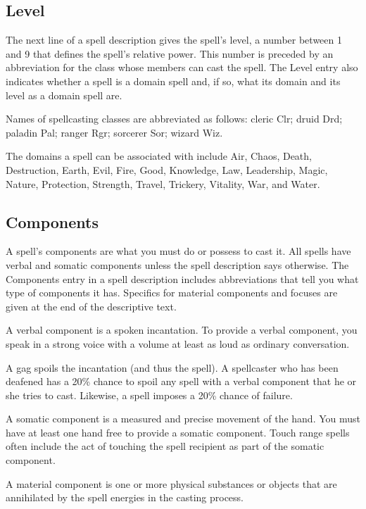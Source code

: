 \subsection{Level}
The next line of a spell description gives the spell's level, a number between 1 and 9 that defines the spell's relative power. This number is preceded by an abbreviation for the class whose members can cast the spell. The Level entry also indicates whether a spell is a domain spell and, if so, what its domain and its level as a domain spell are.

Names of spellcasting classes are abbreviated as follows: cleric Clr; druid Drd; paladin Pal; ranger Rgr; sorcerer Sor; wizard Wiz.

The domains a spell can be associated with include Air, Chaos, Death, Destruction, Earth, Evil, Fire, Good, Knowledge, Law, Leadership, Magic, Nature, Protection, Strength, Travel, Trickery, Vitality, War, and Water.

\subsection{Components}
A spell's components are what you must do or possess to cast it. All spells have verbal and somatic components unless the spell description says otherwise. The Components entry in a spell description includes abbreviations that tell you what type of components it has. Specifics for material components and focuses are given at the end of the descriptive text.

 A verbal component is a spoken incantation. To provide a verbal component, you speak in a strong voice with a volume at least as loud as ordinary conversation.

A gag spoils the incantation (and thus the spell). A spellcaster who has been deafened has a 20\% chance to spoil any spell with a verbal component that he or she tries to cast. Likewise, a  spell imposes a 20\% chance of failure.

 A somatic component is a measured and precise movement of the hand. You must have at least one hand free to provide a somatic component. Touch range spells often include the act of touching the spell recipient as part of the somatic component.

 A material component is one or more physical substances or objects that are annihilated by the spell energies in the casting process.

